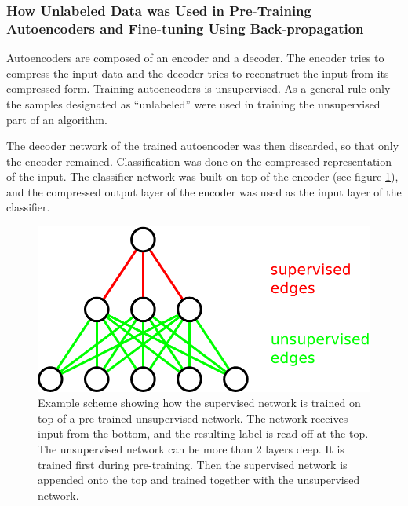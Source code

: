 \subsubsection{How Unlabeled Data was Used in Pre-Training Autoencoders and Fine-tuning
Using Back-propagation}

Autoencoders are composed of an encoder
and a decoder. The encoder tries to compress the input
data and the decoder tries to reconstruct the input from its compressed
form. Training autoencoders is unsupervised. As a general rule only
the samples designated as ``unlabeled'' were used in training the
unsupervised part of an algorithm.

The decoder network of the trained autoencoder was then discarded,
so that only the encoder remained. Classification was done on the
compressed representation of the input. The classifier network was
built on top of the encoder (see figure \ref{fig:supervised-network-on-top-of-unsupervised}),
and the compressed output layer of the encoder was used as the input
layer of the classifier.

\begin{figure}
\begin{centering}
\includegraphics[width=0.35\paperwidth]{images/progress_report_201411-unsupervised-to-supervised}
\par\end{centering}
\caption[How a supervised network is trained on top of a pre-trained unsupervised
network.]{\label{fig:supervised-network-on-top-of-unsupervised}Example scheme
showing how the supervised network is trained on top of a pre-trained
unsupervised network. The network receives input from the bottom,
and the resulting label is read off at the top. The unsupervised network
can be more than 2 layers deep. It is trained first during pre-training.
Then the supervised network is appended onto the top and trained together
with the unsupervised network.}
\end{figure}

